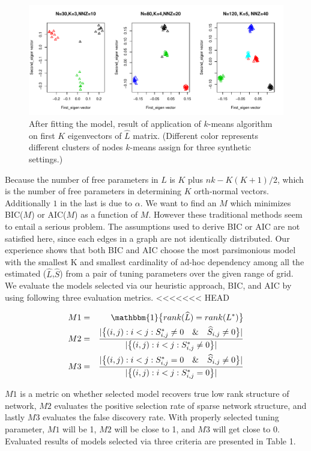 \documentclass[AMS,STIX1COL]{WileyNJD-v2}
\begin{document}
\begin{figure}[htbp]
\includegraphics[width=1\textwidth]{Fig1.pdf}
\caption{After fitting the model, result of application of $k$-means algorithm on first $K$ eigenvectors of $\widehat{L}$ matrix. (Different color represents different clusters of nodes $k$-means assign for three synthetic settings.) }
\label{fig:figure1}
\end{figure}

Because the number of free parameters in $L$ is $K$ plus $nk - K(K+1)/2$, which is the number of free parameters in determining $K$ orth-normal vectors.
Additionally $1$ in the last is due to $\alpha$.
We want to find an $M$ which minimizes BIC($M$) or AIC($M$) as a function of $M$.
However these traditional methods seem to entail a serious problem.
The assumptions used to derive BIC or AIC are not satisfied here, since each edges in a graph are not identically distributed.
Our experience shows that both BIC and AIC choose the most parsimonious model with the smallest K and smallest cardinality of ad-hoc dependency among all the estimated ($\widehat{L}$,$\widehat{S}$) from a pair of tuning parameters over the given range of grid.
We evaluate the models selected via our heuristic approach, BIC, and AIC by using following three evaluation metrics.
<<<<<<< HEAD

\begin{eqnarray*}
M1 &=& \mathbbm{1}\big\{rank(\widehat{L}) = rank(L^{*})\big\} \\
M2 &=& \frac{|\big\{(i,j):i<j:S^{*}_{i,j} \neq0 \quad \& \quad \widehat{S}_{i,j} \neq 0 \big\}|}{|\big\{(i,j):i<j:S^{*}_{i,j}\neq0\big\}|} \\
M3 &=& \frac{|\big\{(i,j):i<j:S^{*}_{i,j} = 0 \quad \& \quad \widehat{S}_{i,j} \neq 0 \big\}|}{|\big\{(i,j):i<j:S^{*}_{i,j}=0\big\}|}
\end{eqnarray*}

$M1$ is a metric on whether selected model recovers true low rank structure of network,
$M2$ evaluates the positive selection rate of sparse network structure,
and lastly $M3$ evaluates the false discovery rate.
With properly selected tuning parameter, $M1$ will be 1, $M2$ will be close to 1, and $M3$ will get close to 0.
Evaluated results of models selected via three criteria are presented in Table 1.
\end{document}
